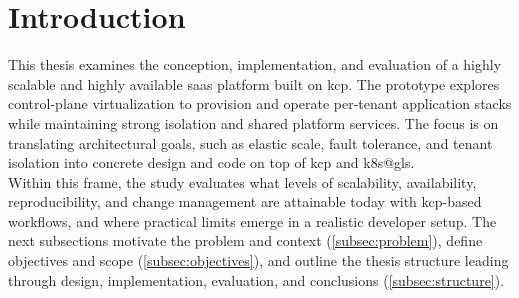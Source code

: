 \documentclass[11pt, a4paper, oneside, listof=totoc]{scrartcl}
\begin{document}
    \clearpage

    \printglossary[type=\acronymtype, title={Acronyms}]
    \cleardoublepage
    \printglossary[title={Glossary}]


    \cleardoublepage

    \begingroup
        \tableofcontents
    \endgroup

    \newpage

    \cleardoublepage
    \begingroup
        \renewcommand{\addcontentsline}[3]{}
        \listoffigures
    \endgroup

    \cleardoublepage
    \begingroup
        \renewcommand{\addcontentsline}[3]{}
        \listoftables
    \endgroup

    \newpage


    \section{Introduction}\label{sec:introduction}
        This thesis examines the conception, implementation, and evaluation of a highly scalable and
        highly available \gls{saas} platform built on \gls{kcp}.
        The prototype explores control-plane virtualization to provision and operate per-tenant
        application stacks while maintaining strong isolation and shared platform services.
        The focus is on translating architectural goals, such as elastic scale, fault tolerance, and
        tenant isolation into concrete design and code on top of \gls{kcp} and \gls{k8s@gls}.\\
        Within this frame, the study evaluates what levels of scalability, availability,
        reproducibility, and change management are attainable today with \gls{kcp}-based workflows,
        and where practical limits emerge in a realistic developer setup.
        The next subsections motivate the problem and context (\autoref{subsec:problem}), define
        objectives and scope (\autoref{subsec:objectives}), and outline the thesis structure leading
        through design, implementation, evaluation, and conclusions (\autoref{subsec:structure}).
\end{document}
